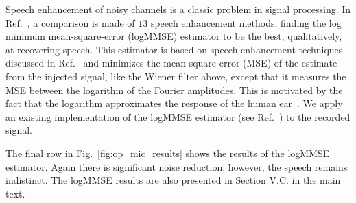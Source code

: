 \documentclass[aps,pra,superscriptaddress,reprint,nofootinbib]{revtex4-1}
\begin{document}
Speech enhancement of noisy channels is a classic problem in signal processing. 
In Ref.~\cite{SubjectiveComparison}, a comparison is made of $13$ speech enhancement methods, finding the log minimum mean-square-error (logMMSE) estimator to be the best, qualitatively, at recovering speech. 
This estimator is based on speech enhancement techniques discussed in Ref.~\cite{Ephraim1984SpeechEU_logMMSE} and minimizes the mean-square-error (MSE) of the estimate from the injected signal, like the Wiener filter above, except that it measures the MSE between the logarithm of the Fourier amplitudes. This is motivated by the fact that the logarithm approximates the response of the human ear~\cite{SubjectiveComparison}. We apply an existing implementation of the logMMSE estimator (see Ref.~\cite{logmmse}) to the recorded signal.

The final row in Fig.~\ref{fig:op_mic_results} shows the results of the logMMSE estimator.
Again there is significant noise reduction, however, the speech remains indistinct.
The logMMSE results are also presented in Section V.C. in the main text. 





\end{document}
